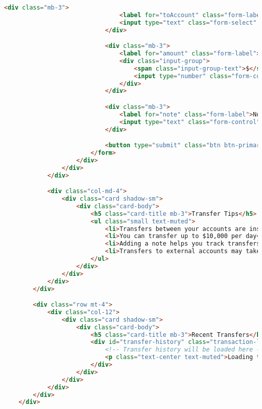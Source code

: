 \begin{lstlisting}[language=HTML]
                            <div class="mb-3">
                                <label for="toAccount" class="form-label">To Account</label>
                                <input type="text" class="form-select" id="toAccount" name="fromAccount" required>
                            </div>

                            <div class="mb-3">
                                <label for="amount" class="form-label">Amount</label>
                                <div class="input-group">
                                    <span class="input-group-text">$</span>
                                    <input type="number" class="form-control" id="amount" name="amount" min="0.01" step="0.01" required>
                                </div>
                            </div>

                            <div class="mb-3">
                                <label for="note" class="form-label">Note (optional)</label>
                                <input type="text" class="form-control" id="note" name="note" placeholder="What's this transfer for?">
                            </div>

                            <button type="submit" class="btn btn-primary">Transfer Funds</button>
                        </form>
                    </div>
                </div>
            </div>

            <div class="col-md-4">
                <div class="card shadow-sm">
                    <div class="card-body">
                        <h5 class="card-title mb-3">Transfer Tips</h5>
                        <ul class="small text-muted">
                            <li>Transfers between your accounts are instant</li>
                            <li>You can transfer up to $10,000 per day</li>
                            <li>Adding a note helps you track transfers later</li>
                            <li>Transfers to external accounts may take 1-3 business days</li>
                        </ul>
                    </div>
                </div>
            </div>
        </div>

        <div class="row mt-4">
            <div class="col-12">
                <div class="card shadow-sm">
                    <div class="card-body">
                        <h5 class="card-title mb-3">Recent Transfers</h5>
                        <div id="transfer-history" class="transaction-list">
                            <!-- Transfer history will be loaded here -->
                            <p class="text-center text-muted">Loading transfer history...</p>
                        </div>
                    </div>
                </div>
            </div>
        </div>
    </div>


\end{lstlisting}
